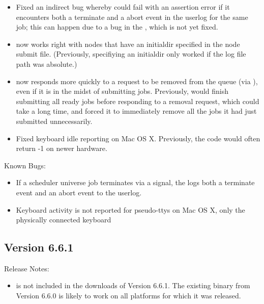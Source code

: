 \begin{itemize}
\item Fixed an indirect bug whereby  could fail with an
assertion error if it encounters both a terminate and a abort event in
the userlog for the same job; this can happen due to a bug in the
, which is not yet fixed.

\item {} now works right with nodes that have an initialdir
  specified in the node submit file.  (Previously, specifiying
  an initialdir only worked if the log file path was absolute.)

\item {} now responds more quickly to a request to be
      removed from the queue (via ), even if it is in the
      midst of submitting jobs.  Previously,  would
      finish submitting all ready jobs before responding to a removal
      request, which could take a long time, and forced it to
      immediately remove all the jobs it had just submitted
      unnecessarily.

\item Fixed keyboard idle reporting on Mac OS X. Previously, the code
      would often return -1 on newer hardware. 

\end{itemize}

\noindent Known Bugs:

\begin{itemize}

\item If a scheduler universe job terminates via a signal, the 
       logs both a terminate event and an abort event
      to the userlog. 

\item Keyboard activity is not reported for pseudo-ttys on Mac OS X, only
      the physically connected keyboard

\end{itemize}


\subsection{\label{sec:New-6-6-1}Version 6.6.1}

\noindent Release Notes:

\begin{itemize}

\item {} is not included in the downloads of Version 6.6.1.
  The existing binary from Version 6.6.0 is likely to work on all platforms
  for which it was released.

\end{itemize}


